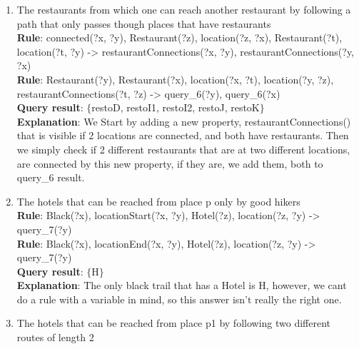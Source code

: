 \documentclass[14pt]
{article}
\begin{document}
\begin{enumerate}
\item The restaurants from which one can reach another restaurant by following a path that only passes though places that have restaurants \\
\textbf{Rule}: connected(?x, ?y), Restaurant(?z), location(?z, ?x), Restaurant(?t), location(?t, ?y) -> restaurantConnections(?x, ?y), restaurantConnections(?y, ?x)\\
\textbf{Rule}: Restaurant(?y), Restaurant(?x), location(?x, ?t), location(?y, ?z), restaurantConnections(?t, ?z) -> query\_6(?y), query\_6(?x)\\
\textbf{Query result}: $\{$restoD, restoI1, restoI2, restoJ, restoK$\}$\\
\textbf{Explanation}: We Start by adding a new property, restaurantConnections() that is visible if 2 locations are connected, and both have restaurants. Then we simply check if 2 different restaurants that are at two different locations, are connected by this new property, if they are, we add them, both to query\_6 result.\\

\item The hotels that can be reached from place p only by good hikers \\
\textbf{Rule}: Black(?x), locationStart(?x, ?y), Hotel(?z), location(?z, ?y) -> query\_7(?y)\\
\textbf{Rule}: Black(?x), locationEnd(?x, ?y), Hotel(?z), location(?z, ?y) -> query\_7(?y)\\
\textbf{Query result}: $\{$H$\}$\\
\textbf{Explanation}: The only black trail that has a Hotel is H, however, we cant do a rule with a variable in mind, so this answer isn't really the right one.\\

\item The hotels that can be reached from place p1 by following two different routes of length 2 \\
\end{enumerate}
\end{document}
